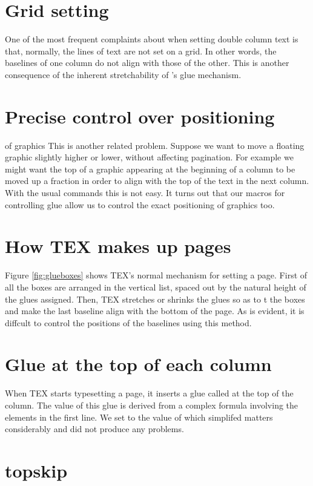 {\section{Grid setting}

One of the most frequent complaints about \tex
when setting double column text is that, normally,
the lines of text are not set on a grid. In other words,
the baselines of one column do not align with those
of the other. This is another consequence of the
inherent stretchability of \tex's glue mechanism.

\section{Precise control over positioning}
of graphics
This is another related problem. Suppose we want
to move a 
floating graphic slightly higher or lower,
without affecting pagination. For example we might
want the top of a graphic appearing at the beginning
of a column to be moved up a fraction in order to
align with the top of the text in the next column.
With the usual \latex commands this is not easy. It
turns out that our macros for controlling glue allow
us to control the exact positioning of graphics too.

\section{How TEX makes up pages}

Figure \ref{fig:glueboxes} shows TEX's normal mechanism for setting
a page. First of all the boxes are arranged in the
vertical list, spaced out by the natural height of the
glues assigned. Then, TEX stretches or shrinks the
glues so as to t the boxes and make the last baseline
align with the bottom of the page. As is evident, it
is diffcult to control the positions of the baselines
using this method.


\section{Glue at the top of each column}

When TEX starts typesetting a page, it inserts a glue
called  at the top of the column. The value
of this glue is derived from a complex formula involving 
the elements in the first line. We set to
the value of  which simplifed matters considerably and did not produce any problems.

\section{topskip}

}
